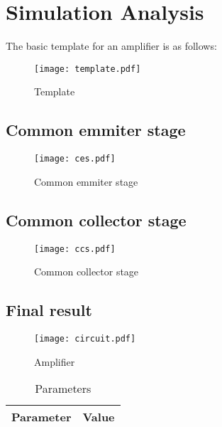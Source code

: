 \newpage

\section{Simulation Analysis}
\label{sec:simulation}

The basic template for an amplifier is as follows:

\begin{figure}[H]
        \centering
        \texttt{[image: template.pdf]}
        \caption{Template}
        \label{template}
\end{figure}

\subsection{Common emmiter stage}

\begin{figure}[H]
        \centering
        \texttt{[image: ces.pdf]}
        \caption{Common emmiter stage}
        \label{ces}
\end{figure}

\subsection{Common collector stage}

\begin{figure}[H]
        \centering
        \texttt{[image: ccs.pdf]}
        \caption{Common collector stage}
        \label{ccs}
\end{figure}

\subsection{Final result}

\begin{figure}[H]
        \centering
        \texttt{[image: circuit.pdf]}
        \caption{Amplifier}
        \label{circuit}
\end{figure}

\begin{table}[H]
        \centering
        \begin{tabular}{|c|c|}
        \hline
        Parameter & Value \\
        \hline
        
        \hline
        \end{tabular}
        \caption{Parameters}
        \label{param}
\end{table}

